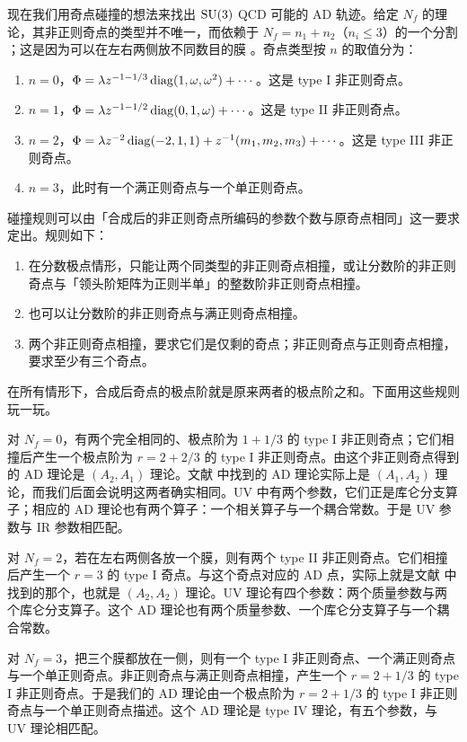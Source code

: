 现在我们用奇点碰撞的想法来找出 $\operatorname{SU}(3)$ QCD 可能的 AD 轨迹。给定 $N_f$ 的理论，其非正则奇点的类型并不唯一，而依赖于 $N_f = n_1+n_2$（$n_i\le 3$）的一个分割 \cite{32}；这是因为可以在左右两侧放不同数目的膜 \cite{45}。奇点类型按 $n$ 的取值分为：
\begin{enumerate}[label=\textup{\alph*.}]
  \item $n=0$，$\Phi = \lambda z^{-1-1/3}\operatorname{diag}(1,\omega,\omega^2)+\cdots$。这是 type I 非正则奇点。
  \item $n=1$，$\Phi = \lambda z^{-1-1/2}\operatorname{diag}(0,1,\omega)+\cdots$。这是 type II 非正则奇点。
  \item $n=2$，$\Phi = \lambda z^{-2}\operatorname{diag}(-2,1,1) + z^{-1}(m_1,m_2,m_3)+\cdots$。这是 type III 非正则奇点。
  \item $n=3$，此时有一个满正则奇点与一个单正则奇点。
\end{enumerate}

碰撞规则可以由「合成后的非正则奇点所编码的参数个数与原奇点相同」这一要求定出。规则如下：
\begin{enumerate}
  \item 在分数极点情形，只能让两个同类型的非正则奇点相撞，或让分数阶的非正则奇点与「领头阶矩阵为正则半单」的整数阶非正则奇点相撞。
  \item 也可以让分数阶的非正则奇点与满正则奇点相撞。
  \item 两个非正则奇点相撞，要求它们是仅剩的奇点；非正则奇点与正则奇点相撞，要求至少有三个奇点。
\end{enumerate}
在所有情形下，合成后奇点的极点阶就是原来两者的极点阶之和。下面用这些规则玩一玩。

对 $N_f=0$，有两个完全相同的、极点阶为 $1+1/3$ 的 type I 非正则奇点；它们相撞后产生一个极点阶为 $r = 2+2/3$ 的 type I 非正则奇点。由这个非正则奇点得到的 AD 理论是 $(A_2,A_1)$ 理论。文献 \cite{12} 中找到的 AD 理论实际上是 $(A_1,A_2)$ 理论，而我们后面会说明这两者确实相同。UV 中有两个参数，它们正是库仑分支算子；相应的 AD 理论也有两个算子：一个相关算子与一个耦合常数。于是 UV 参数与 IR 参数相匹配。

对 $N_f=2$，若在左右两侧各放一个膜，则有两个 type II 非正则奇点。它们相撞后产生一个 $r=3$ 的 type I 奇点。与这个奇点对应的 AD 点，实际上就是文献 \cite{12} 中找到的那个，也就是 $(A_2,A_2)$ 理论。UV 理论有四个参数：两个质量参数与两个库仑分支算子。这个 AD 理论也有两个质量参数、一个库仑分支算子与一个耦合常数。

对 $N_f=3$，把三个膜都放在一侧，则有一个 type I 非正则奇点、一个满正则奇点与一个单正则奇点。非正则奇点与满正则奇点相撞，产生一个 $r=2+1/3$ 的 type I 非正则奇点。于是我们的 AD 理论由一个极点阶为 $r=2+1/3$ 的 type I 非正则奇点与一个单正则奇点描述。这个 AD 理论是 type IV 理论，有五个参数，与 UV 理论相匹配。

